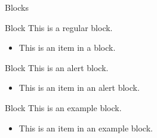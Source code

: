 \documentclass{beamer} %
\begin{document}
\begin{frame}{Blocks}
    \begin{block}{Block}
        This is a regular block.
        \begin{itemize}
            \item This is an item in a block.
        \end{itemize}
    \end{block}
    
    \begin{alertblock}{Block}
        This is an alert block.
        \begin{itemize}
            \item This is an item in an alert block.
        \end{itemize}
    \end{alertblock}
    
    \begin{exampleblock}{Block}
        This is an example block.
        \begin{itemize}
            \item This is an item in an example block.
        \end{itemize}
    \end{exampleblock}
\end{frame}
\end{document}
